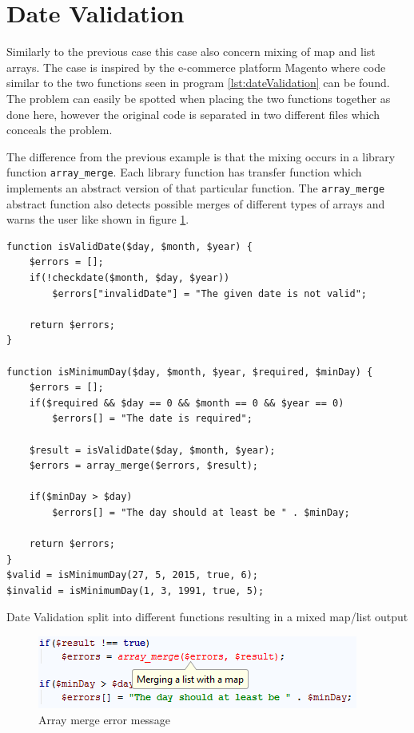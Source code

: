 \section{Date Validation}
Similarly to the previous case this case also concern mixing of map and list arrays. The case is inspired by the e-commerce platform Magento where code similar to the two functions seen in program \ref{lst:dateValidation} can be found. The problem can easily be spotted when placing the two functions together as done here, however the original code is separated in two different files which conceals the problem.

The difference from the previous example is that the mixing occurs in a library function \texttt{array\_merge}. Each library function has transfer function which implements an abstract version of that particular function. The \texttt{array\_merge} abstract function also detects possible merges of different types of arrays and warns the user like shown in figure \ref{fig:dateScreenshot}.

\begin{program}
\begin{lstlisting}
function isValidDate($day, $month, $year) {
    $errors = [];
    if(!checkdate($month, $day, $year))
        $errors["invalidDate"] = "The given date is not valid";

    return $errors;
}

function isMinimumDay($day, $month, $year, $required, $minDay) {
    $errors = [];
    if($required && $day == 0 && $month == 0 && $year == 0)
        $errors[] = "The date is required";

    $result = isValidDate($day, $month, $year);
    $errors = array_merge($errors, $result);

    if($minDay > $day)
        $errors[] = "The day should at least be " . $minDay;

    return $errors;
}
$valid = isMinimumDay(27, 5, 2015, true, 6);
$invalid = isMinimumDay(1, 3, 1991, true, 5);
\end{lstlisting}
\caption{Date Validation split into different functions resulting in a mixed map/list output}
\label{lst:dateValidation}
\end{program}

\begin{figure}
\centering
\includegraphics[scale=0.6]{chapters/caseStudy/dateError}
\caption{Array merge error message}
\label{fig:dateScreenshot}
\end{figure}